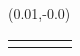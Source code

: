 \begin{titlepage}
\begin{textblock}{3}(0.01,-0.0)
\begin{tabular}{ P Q R S }
\hspace{0cm}
&\hspace{0.7cm}
&\hspace{0cm}
&\hspace{0cm}
\\
\end{tabular}
\end{textblock}


\end{titlepage}
